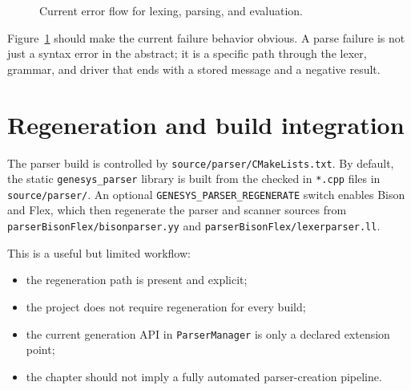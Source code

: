 \begin{figure}[htbp]
\centering
\caption{Current error flow for lexing, parsing, and evaluation.}
\label{fig:parser-error-flow}
\end{figure}

Figure~\ref{fig:parser-error-flow} should make the current failure behavior
obvious. A parse failure is not just a syntax error in the abstract; it is a
specific path through the lexer, grammar, and driver that ends with a stored
message and a negative result.

\section{Regeneration and build integration}
\label{sec:parser-regeneration}

The parser build is controlled by \texttt{source/parser/CMakeLists.txt}. By
default, the static \texttt{genesys\_parser} library is built from the checked
in \texttt{*.cpp} files in \texttt{source/parser/}. An optional
\texttt{GENESYS\_PARSER\_REGENERATE} switch enables Bison and Flex, which then
regenerate the parser and scanner sources from
\texttt{parserBisonFlex/bisonparser.yy} and
\texttt{parserBisonFlex/lexerparser.ll}.

This is a useful but limited workflow:
\begin{itemize}
\item the regeneration path is present and explicit;
\item the project does not require regeneration for every build;
\item the current generation API in \texttt{ParserManager} is only a declared
      extension point;
\item the chapter should not imply a fully automated parser-creation pipeline.
\end{itemize}

